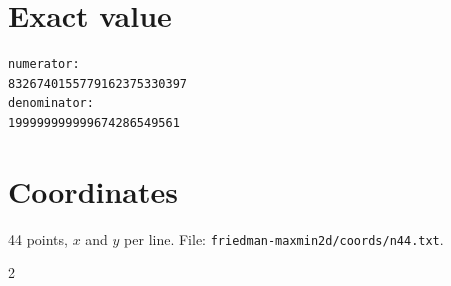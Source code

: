 \documentclass[11pt,a4paper]{article}
\begin{document}
\appendix
\section{Exact value}
{\small
\begin{verbatim}
numerator:
8326740155779162375330397
denominator:
199999999999674286549561
\end{verbatim}}

\section{Coordinates}
44 points, $x$ and $y$ per line. File: \texttt{friedman-maxmin2d/coords/n44.txt}.
{\tiny
\begin{multicols}{2}
\end{multicols}}
\end{document}
